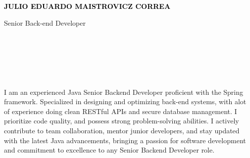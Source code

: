\documentclass[9pt]{developercv} %
\begin{document}

\begin{minipage}[t]{0.5\textwidth} 
	\vspace{-\baselineskip} %
	
	{ \fontsize{16}{20} \textcolor{black}{\textbf{\MakeUppercase{Julio Eduardo Maistrovicz Correa}}}} %
	
	\vspace{6pt}
	
	{\Large Senior Back-end Developer } %
\end{minipage}
\hfill
\begin{minipage}[t]{0.2\textwidth} %
	\vspace{-\baselineskip} %
	
    \\
    \\
	
\end{minipage}
\begin{minipage}[t]{0.27\textwidth} %
	\vspace{-\baselineskip} %
	
	\\	
    \\    
    
\end{minipage}
\begin{minipage}[t]{0.46\textwidth}
	\vspace{-6pt}
 
    I am an experienced Java Senior Backend Developer proficient with the Spring framework. Specialized in designing and optimizing back-end systems, with alot of experience doing clean RESTful APIs and secure database management. I prioritize code quality, and possess strong problem-solving abilities. I actively contribute to team collaboration, mentor junior developers, and stay updated with the latest Java advancements, bringing a passion for software development and commitment to excellence to any Senior Backend Developer role.
\end{minipage}
\end{document}
